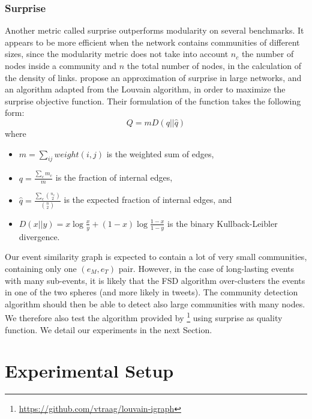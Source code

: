 \subsubsection{Surprise}
Another metric called surprise \citep{aldecoa_deciphering_2011} outperforms modularity on several benchmarks. It appears to be more efficient when the network contains communities of different sizes, since the modularity metric does not take into account $n_c$ the number of nodes inside a community and $n$ the total number of nodes, in the calculation of the density of links. \cite{traag2015detecting} propose an approximation of surprise in large networks, and an algorithm adapted from the Louvain algorithm, in order to maximize the surprise objective function. Their formulation of the function takes the following form:
\begin{equation}
    Q=mD(q || \hat{q})
\end{equation}
where
\begin{itemize}
    \item $m= \sum\limits_{ij} weight(i,j)$ is the weighted sum of edges,
    \item $q = \frac{\sum\limits_{c}m_c}{m}$ is the fraction of internal edges,
    \item $\hat{q} = \frac{\sum\limits_{c}\binom{n_c}{2}}{\binom{n}{2}}$ is the expected fraction of internal edges, and
    \item $D(x||y) = x \log \frac{x}{y} + (1 - x) \log \frac{1-x}{1-y}$ is the binary Kullback-Leibler divergence.
\end{itemize}
Our event similarity graph is expected to contain a lot of very small communities, containing only one $(e_M, e_T)$ pair. However, in the case of long-lasting events with many sub-events, it is likely that the FSD algorithm over-clusters the events in one of the two spheres (and more likely in tweets). The community detection algorithm should then be able to detect also large communities with many nodes. We therefore also test the algorithm provided by \cite{traag2015detecting}\footnote{\url{https://github.com/vtraag/louvain-igraph}} using surprise as quality function. We detail our experiments in the next Section.

\section{Experimental Setup}
